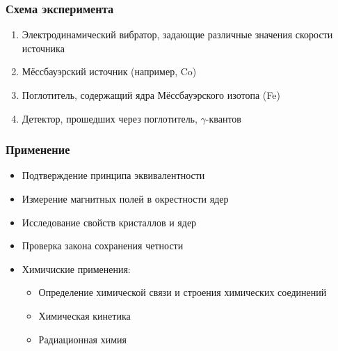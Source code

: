 \documentclass[t]{beamer}
\begin{document}
\begin{frame}
  \frametitle{Схема эксперимента}
  \begin{enumerate}
    \item Электродинамический вибратор, задающие различные значения скорости источника
    \item Мёссбауэрский источник (например, Co)
    \item Поглотитель, содержащий ядра Мёссбауэрского изотопа (Fe)
    \item Детектор, прошедших через поглотитель, $\gamma$-квантов
  \end{enumerate}
\end{frame}

\begin{frame}
  \frametitle{Применение}
  
  \begin{itemize}
    \item Подтверждение принципа эквивалентности\pause
    \item Измерение магнитных полей в окрестности ядер\pause
    \item Исследование свойств кристаллов и ядер\pause
    \item Проверка закона сохранения четности\pause
    \item Химичиские применения:
      \begin{itemize}
        \item Определение химической связи и строения химических соединений
        \item Химическая кинетика
        \item Радиационная химия
      \end{itemize}

  \end{itemize}
\end{frame}
\end{document}
